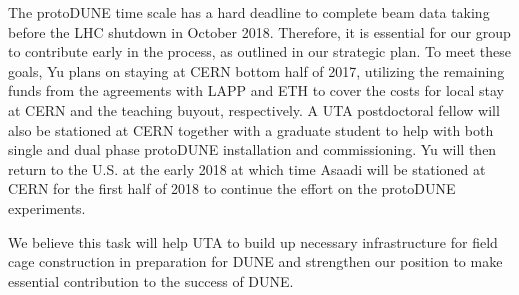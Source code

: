 The protoDUNE time scale has a hard deadline to complete beam data taking before the LHC shutdown in October 2018.  Therefore, it is essential for our group to contribute early in the process, as outlined in our strategic plan. To meet these goals, Yu plans on staying at CERN bottom half of 2017, utilizing the remaining funds from the agreements with LAPP and ETH to cover the costs for local stay at CERN and the teaching buyout, respectively.  A UTA postdoctoral fellow will also be stationed at CERN together with a graduate student to help with both single and dual phase protoDUNE installation and commissioning.   Yu will then return to the U.S. at the early 2018 at which time Asaadi will be stationed at CERN for the first half of 2018 to continue the effort on the protoDUNE experiments.

We believe this task will help UTA to build up necessary infrastructure for field cage construction in preparation for DUNE and strengthen our position to make essential contribution to the success of DUNE.
